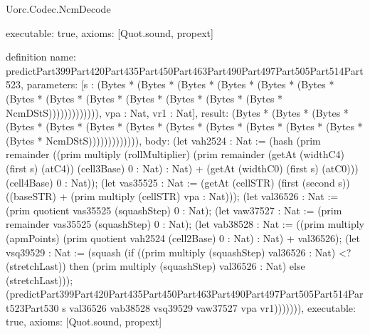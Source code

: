 \begin{lexlean}{Uorc.Codec.NcmDecode}
\begin{semanticmodule}
{  executable: true,
  axioms: [Quot.sound, propext]
}

definition{
  name: predictPart399Part420Part435Part450Part463Part490Part497Part505Part514Part523,
  parameters: [s : (Bytes * (Bytes * (Bytes * (Bytes * (Bytes * (Bytes * (Bytes * (Bytes * (Bytes * (Bytes * (Bytes * (Bytes * (Bytes * NcmDStS))))))))))))), vpa : Nat, vr1 : Nat],
  result: (Bytes * (Bytes * (Bytes * (Bytes * (Bytes * (Bytes * (Bytes * (Bytes * (Bytes * (Bytes * (Bytes * (Bytes * (Bytes * NcmDStS))))))))))))),
  body: (let vah2524 : Nat := (hash (prim remainder ((prim multiply (rollMultiplier) (prim remainder (getAt (widthC4) (first s) (atC4)) (cell3Base) 0 : Nat) : Nat) + (getAt (widthC0) (first s) (atC0))) (cell4Base) 0 : Nat)); (let vas35525 : Nat := (getAt (cellSTR) (first (second s)) ((baseSTR) + (prim multiply (cellSTR) vpa : Nat))); (let val36526 : Nat := (prim quotient vas35525 (squashStep) 0 : Nat); (let vaw37527 : Nat := (prim remainder vas35525 (squashStep) 0 : Nat); (let vab38528 : Nat := ((prim multiply (apmPoints) (prim quotient vah2524 (cell2Base) 0 : Nat) : Nat) + val36526); (let vsq39529 : Nat := (squash (if ((prim multiply (squashStep) val36526 : Nat) <? (stretchLast)) then (prim multiply (squashStep) val36526 : Nat) else (stretchLast))); (predictPart399Part420Part435Part450Part463Part490Part497Part505Part514Part523Part530 s val36526 vab38528 vsq39529 vaw37527 vpa vr1))))))),
  executable: true,
  axioms: [Quot.sound, propext]
}


\end{semanticmodule}
\end{lexlean}
